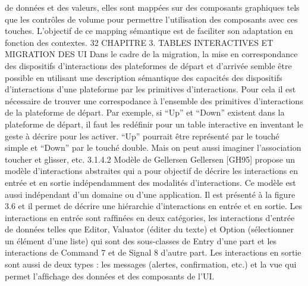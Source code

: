 \documentclass{article}
\begin{document}
de donn\'{e}es et des valeurs, elles sont mapp\'{e}es sur des composants graphiques tels que les contr\^{o}les
de volume pour permettre l’utilisation des composants avec ces touches. L’objectif de ce mapping
s\'{e}mantique est de faciliter son adaptation en fonction des contextes.
32
CHAPITRE 3. TABLES INTERACTIVES ET MIGRATION DES UI
Dans le cadre de la migration, la mise en correspondance des dispositifs d’interactions des plateformes de d\'{e}part et d’arriv\'{e}e semble \^{e}tre possible en utilisant une description s\'{e}mantique des capacit\'{e}s des dispositifs d’interactions d’une plateforme par les primitives d’interactions. Pour cela il est
n\'{e}cessaire de trouver une correspodance \`{a} l’ensemble des primitives d’interactions de la plateforme de
d\'{e}part. Par exemple, si “Up” et “Down” existent dans la plateforme de d\'{e}part, il faut les red\'{e}ﬁnir pour
un table interactive en inventant le geste \`{a} d\'{e}crire pour les activer. “Up” pourrait \^{e}tre repr\'{e}sent\'{e} par le
touch\'{e} simple et “Down” par le touch\'{e} double. Mais on peut aussi imaginer l’association toucher et
glisser, etc.
3.1.4.2
Mod\`{e}le de Gellersen
Gellersen [GH95] propose un mod\`{e}le d’interactions abstraites qui a pour objectif de d\'{e}crire les
interactions en entr\'{e}e et en sortie ind\'{e}pendamment des modalit\'{e}s d’interactions. Ce mod\`{e}le est aussi
ind\'{e}pendant d’un domaine ou d’une application. Il est pr\'{e}sent\'{e} \`{a} la ﬁgure 3.6 et il permet de d\'{e}crire
une hi\'{e}rarchie d’interactions en entr\'{e}e et en sortie. Les interactions en entr\'{e}e sont rafﬁn\'{e}es en deux
cat\'{e}gories, les interactions d’entr\'{e}e de donn\'{e}es telles que Editor, Valuator (\'{e}diter du texte) et Option
(s\'{e}lectionner un \'{e}l\'{e}ment d’une liste) qui sont des sous-classes de Entry d’une part et les interactions
de Command 7 et de Signal 8 d’autre part. Les interactions en sortie sont aussi de deux types : les
messages (alertes, conﬁrmation, etc.) et la vue qui permet l’afﬁchage des donn\'{e}es et des composants
de l’UI.
 
\end{document}
